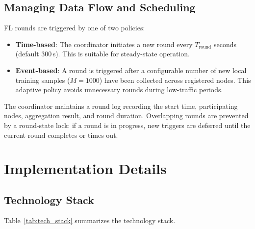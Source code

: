 \subsection{Managing Data Flow and Scheduling}
\label{subsec:design_scheduling}

FL rounds are triggered by one of two policies:

\begin{itemize}
    \item \textbf{Time-based}: The coordinator initiates a new round every
    $T_{\text{round}}$ seconds (default 300\,s). This is suitable for
    steady-state operation.

    \item \textbf{Event-based}: A round is triggered after a configurable
    number of new local training samples ($M=1000$) have been collected across
    registered nodes. This adaptive policy avoids unnecessary rounds during
    low-traffic periods.
\end{itemize}

The coordinator maintains a round log recording the start time, participating
nodes, aggregation result, and round duration. Overlapping rounds are
prevented by a round-state lock: if a round is in progress, new triggers are
deferred until the current round completes or times out.

\section{Implementation Details}
\label{sec:design_implementation}

\subsection{Technology Stack}
\label{subsec:design_stack}

Table~\ref{tab:tech_stack} summarizes the technology stack.

